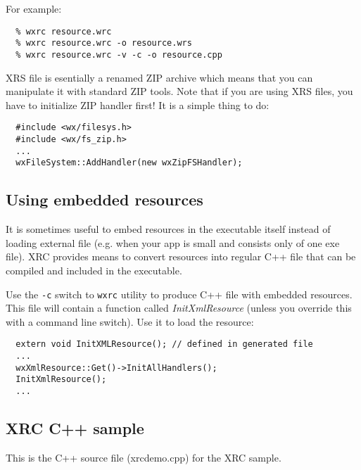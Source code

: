 For example:
\begin{verbatim}
  % wxrc resource.wrc
  % wxrc resource.wrc -o resource.wrs
  % wxrc resource.wrc -v -c -o resource.cpp
\end{verbatim}


XRS file is esentially a renamed ZIP archive which means that you can manipulate
it with standard ZIP tools. Note that if you are using XRS files, you have
to initialize  ZIP handler first! It is a simple
thing to do:
\begin{verbatim}
  #include <wx/filesys.h>
  #include <wx/fs_zip.h>
  ...
  wxFileSystem::AddHandler(new wxZipFSHandler);
\end{verbatim}

\subsection{Using embedded resources}\label{embeddedresource}

It is sometimes useful to embed resources in the executable itself instead
of loading external file (e.g. when your app is small and consists only of one
exe file). XRC provides means to convert resources into regular C++ file that
can be compiled and included in the executable. 

Use the {\tt -c} switch to
{\tt wxrc} utility to produce C++ file with embedded resources. This file will
contain a function called {\it InitXmlResource} (unless you override this with
a command line switch). Use it to load the resource:
\begin{verbatim}
  extern void InitXMLResource(); // defined in generated file
  ...
  wxXmlResource::Get()->InitAllHandlers();
  InitXmlResource();
  ...
\end{verbatim}

\subsection{XRC C++ sample}\label{xrccppsample}

This is the C++ source file (xrcdemo.cpp) for the XRC sample.

